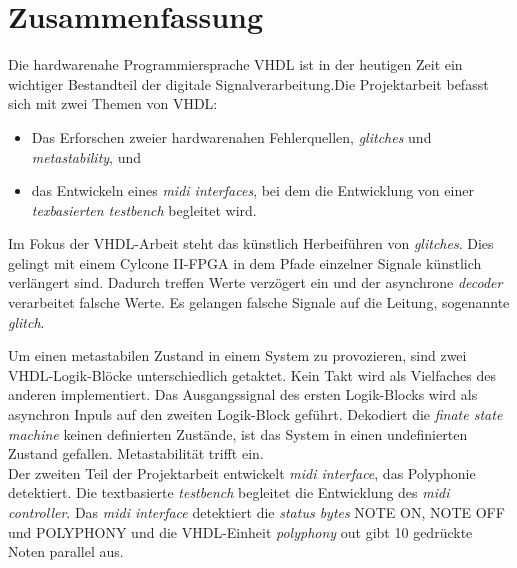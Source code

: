 
\chapter*{Zusammenfassung}


Die hardwarenahe Programmiersprache VHDL ist in der heutigen Zeit ein wichtiger Bestandteil der digitale Signalverarbeitung.Die Projektarbeit befasst sich mit zwei Themen von VHDL:\\
\begin{itemize}
\item Das Erforschen zweier hardwarenahen Fehlerquellen, \textit{glitches} und \textit{metastability}, und 
	\item das Entwickeln eines \textit{midi interfaces}, bei dem die Entwicklung von einer \textit{texbasierten testbench} begleitet wird.
\end{itemize} 


Im Fokus der VHDL-Arbeit steht das künstlich Herbeiführen von \textit{glitches}. Dies gelingt mit einem Cylcone II-FPGA in dem Pfade einzelner Signale künstlich verlängert sind. Dadurch treffen Werte verzögert ein und der asynchrone \textit{decoder} verarbeitet falsche Werte. Es gelangen falsche Signale auf die Leitung, sogenannte \textit{glitch}. 


Um einen metastabilen Zustand in einem System zu provozieren, sind zwei VHDL-Logik-Blöcke unterschiedlich getaktet. Kein Takt wird als Vielfaches des anderen implementiert. Das Ausgangssignal des ersten Logik-Blocks wird als asynchron Inpuls auf den zweiten Logik-Block geführt. Dekodiert die \textit{finate state machine} keinen definierten Zustände, ist das System in einen undefinierten Zustand gefallen. Metastabilität trifft ein.\\


Der zweiten Teil der Projektarbeit entwickelt \textit{midi interface}, das Polyphonie detektiert. Die textbasierte \textit{testbench} begleitet die Entwicklung des \textit{midi controller}. Das \textit{midi interface} detektiert die \textit{status bytes} NOTE ON, NOTE OFF und POLYPHONY und die VHDL-Einheit \textit{polyphony} out gibt 10 gedrückte Noten parallel aus.\\







